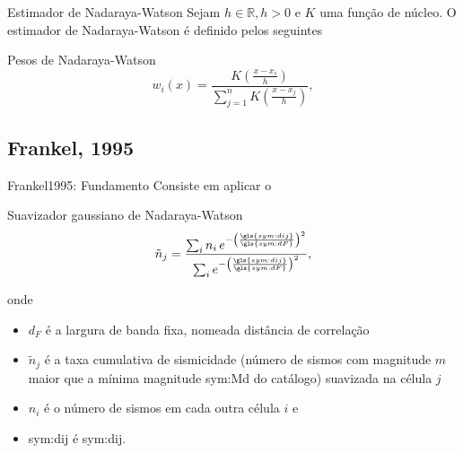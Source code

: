 \documentclass[ucs,8pt]{beamer}
\begin{document}
\begin{frame}{Estimador de Nadaraya-Watson}
	Sejam $h \in \mathbb{R}, h > 0$ e $K$ uma função de núcleo.
	O estimador de Nadaraya-Watson é definido pelos seguintes
	\begin{block}{Pesos de Nadaraya-Watson}
		\begin{equation}
			\ensuremath{
				w_i(x) = \frac{ K\left( \frac{x - x_i}{h} \right)}
							  {\sum_{j=1}^{n} K\left( \frac{x - x_j}{h} \right) },
			}
		\label{eq:rate_wi}
		\end{equation}
	\end{block}
\end{frame}


\subsection{Frankel, 1995}

\begin{frame}{Frankel1995: Fundamento}
Consiste em aplicar o
\begin{block}{Suavizador gaussiano de Nadaraya-Watson}
\begin{equation}
	\ensuremath{
		\tilde{n}_j = \frac{ \sum_{i} n_i \,e^{ - \left(\frac{\gls{sym:dij}}{\gls{sym:dF}}\right)^2}}
						   { \sum_{i}     e^{ - \left(\frac{\gls{sym:dij}}{\gls{sym:dF}}\right)^2}},
	}
	\label{eq:ni}
\end{equation}
\end{block}
onde 
\begin{itemize}
	\item $d_F$ é a largura de banda \alert{fixa}, nomeada distância de
	correlação
	\item $\tilde{n}_j$ é a taxa cumulativa de sismicidade (número de sismos com magnitude
	$m$ maior que a mínima magnitude \gls{sym:Md} do catálogo) suavizada na célula $j$
	\item $n_i$ é o número de sismos em cada outra célula $i$ e
	\item \gls{sym:dij} é \glsdesc{sym:dij}.
\end{itemize}
\end{frame}
\end{document}
